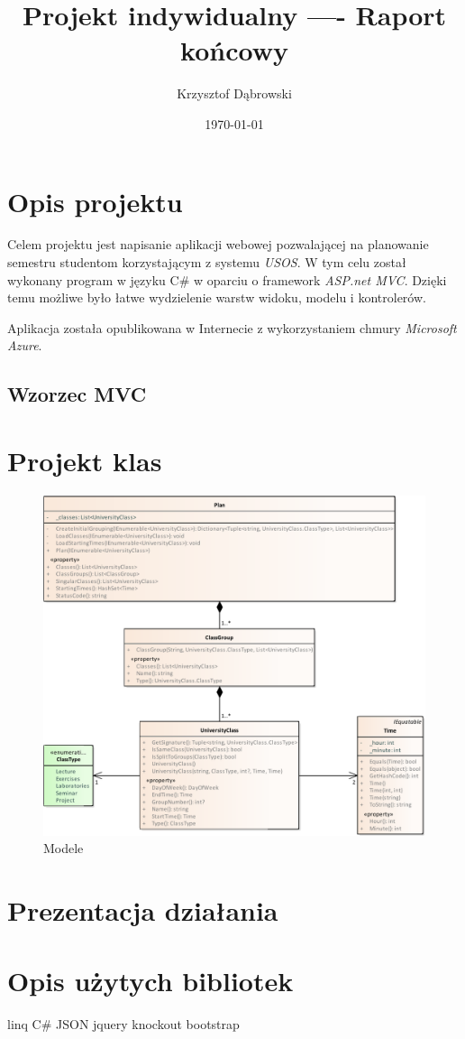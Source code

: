 \documentclass{mwart}
\title{Projekt indywidualny ----  Raport końcowy}
\author{Krzysztof Dąbrowski}
\date{\today}
\begin{document}
\maketitle{}

\tableofcontents{}


\section{Opis projektu}
Celem projektu jest napisanie aplikacji webowej pozwalającej na planowanie semestru studentom korzystającym z systemu \textit{USOS}.
W tym celu został wykonany program w języku C\# w oparciu o framework \textit{ASP.net MVC}. Dzięki temu możliwe było łatwe wydzielenie warstw widoku, modelu i kontrolerów.

Aplikacja została opublikowana w Internecie z wykorzystaniem chmury \textit{Microsoft Azure}.

\subsection{Wzorzec MVC}

\newpage{}
\section{Projekt klas}
\begin{figure}[H]
    \centering
    \includegraphics[width=13cm]{klasy.pdf}
    \caption{Modele}
    \label{}
\end{figure}

\section{Prezentacja działania}

\section{Opis użytych bibliotek}
linq
C\# JSON
jquery
knockout
bootstrap
\end{document}

